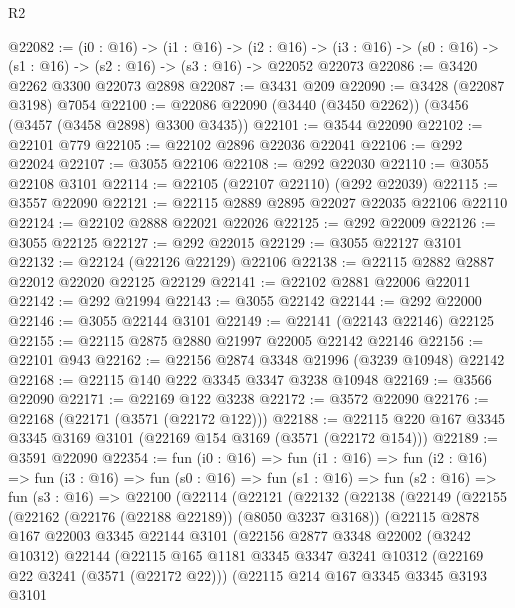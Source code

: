 \begin{lexlean}{R2}
\begin{coremodule}
@22082 := (i0 : @16) ->
  (i1 : @16) ->
  (i2 : @16) -> (i3 : @16) -> (s0 : @16) -> (s1 : @16) -> (s2 : @16) -> (s3 : @16) -> @22052 @22073
@22086 := @3420 @2262 @3300 @22073 @2898
@22087 := @3431 @209
@22090 := @3428 (@22087 @3198) @7054
@22100 := @22086 @22090 (@3440 (@3450 @2262)) (@3456 (@3457 (@3458 @2898) @3300 @3435))
@22101 := @3544 @22090
@22102 := @22101 @779
@22105 := @22102 @2896 @22036 @22041
@22106 := @292 @22024
@22107 := @3055 @22106
@22108 := @292 @22030
@22110 := @3055 @22108 @3101
@22114 := @22105 (@22107 @22110) (@292 @22039)
@22115 := @3557 @22090
@22121 := @22115 @2889 @2895 @22027 @22035 @22106 @22110
@22124 := @22102 @2888 @22021 @22026
@22125 := @292 @22009
@22126 := @3055 @22125
@22127 := @292 @22015
@22129 := @3055 @22127 @3101
@22132 := @22124 (@22126 @22129) @22106
@22138 := @22115 @2882 @2887 @22012 @22020 @22125 @22129
@22141 := @22102 @2881 @22006 @22011
@22142 := @292 @21994
@22143 := @3055 @22142
@22144 := @292 @22000
@22146 := @3055 @22144 @3101
@22149 := @22141 (@22143 @22146) @22125
@22155 := @22115 @2875 @2880 @21997 @22005 @22142 @22146
@22156 := @22101 @943
@22162 := @22156 @2874 @3348 @21996 (@3239 @10948) @22142
@22168 := @22115 @140 @222 @3345 @3347 @3238 @10948
@22169 := @3566 @22090
@22171 := @22169 @122 @3238
@22172 := @3572 @22090
@22176 := @22168 (@22171 (@3571 (@22172 @122)))
@22188 := @22115 @220 @167 @3345 @3345 @3169 @3101 (@22169 @154 @3169 (@3571 (@22172 @154)))
@22189 := @3591 @22090
@22354 := fun (i0 : @16) =>
  fun (i1 : @16) =>
  fun (i2 : @16) =>
  fun (i3 : @16) =>
  fun (s0 : @16) =>
  fun (s1 : @16) =>
  fun (s2 : @16) =>
  fun (s3 : @16) =>
  @22100
    (@22114
      (@22121
        (@22132
          (@22138
            (@22149
              (@22155
                (@22162 (@22176 (@22188 @22189)) (@8050 @3237 @3168))
                (@22115
                  @2878
                  @167
                  @22003
                  @3345
                  @22144
                  @3101
                  (@22156
                    @2877
                    @3348
                    @22002
                    (@3242 @10312)
                    @22144
                    (@22115
                      @165
                      @1181
                      @3345
                      @3347
                      @3241
                      @10312
                      (@22169 @22 @3241 (@3571 (@22172 @22)))
                      (@22115
                        @214
                        @167
                        @3345
                        @3345
                        @3193
                        @3101

\end{coremodule}
\end{lexlean}
